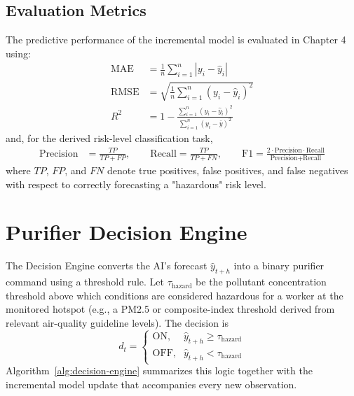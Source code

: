 \subsection{Evaluation Metrics}
The predictive performance of the incremental model is evaluated in Chapter 4 using:
\begin{align}
\text{MAE} &= \frac{1}{n}\sum_{i=1}^{n} \left| y_i - \hat{y}_i \right| \label{eq:mae}\\
\text{RMSE} &= \sqrt{\frac{1}{n}\sum_{i=1}^{n} \left( y_i - \hat{y}_i \right)^2} \label{eq:rmse}\\
R^2 &= 1 - \frac{\sum_{i=1}^{n}(y_i - \hat{y}_i)^2}{\sum_{i=1}^{n}(y_i - \bar{y})^2} \label{eq:r2}
\end{align}
and, for the derived risk-level classification task,
\begin{align}
\text{Precision} &= \frac{TP}{TP+FP}, \qquad
\text{Recall} = \frac{TP}{TP+FN}, \qquad
\text{F1} = \frac{2\cdot\text{Precision}\cdot\text{Recall}}{\text{Precision}+\text{Recall}}
\label{eq:prf1}
\end{align}
where $TP$, $FP$, and $FN$ denote true positives, false positives, and false negatives with respect to correctly forecasting a "hazardous" risk level.

\section{Purifier Decision Engine}
\label{sec:meth-decision}

The Decision Engine converts the AI's forecast $\hat{y}_{t+h}$ into a binary purifier command using a threshold rule. Let $\tau_{\text{hazard}}$ be the pollutant concentration threshold above which conditions are considered hazardous for a worker at the monitored hotspot (e.g., a PM2.5 or composite-index threshold derived from relevant air-quality guideline levels). The decision is
\begin{equation}
d_t =
\begin{cases}
\text{ON}, & \hat{y}_{t+h} \geq \tau_{\text{hazard}} \\
\text{OFF}, & \hat{y}_{t+h} < \tau_{\text{hazard}}
\end{cases}
\label{eq:decision-rule}
\end{equation}
Algorithm~\ref{alg:decision-engine} summarizes this logic together with the incremental model update that accompanies every new observation.

